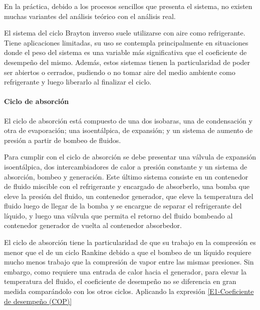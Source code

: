 	En la práctica, debido a los procesos sencillos que presenta el sistema, no existen muchas variantes del análisis teórico con el análisis real.

	El sistema del ciclo Brayton inverso suele utilizarse con aire como refrigerante. Tiene aplicaciones limitadas, su uso se contempla principalmente en situaciones donde el peso del sistema es una variable más significativa que el coeficiente de desempeño del mismo. Además, estos sistemas tienen la particularidad de poder ser abiertos o cerrados, pudiendo o no tomar aire del medio ambiente como refrigerante y luego liberarlo al finalizar el ciclo.


	\paragraph{Ciclo de absorción} El ciclo de absorción está compuesto de una dos isobaras, una de condensación y otra de evaporación; una isoentálpica, de expansión; y un sistema de aumento de presión a partir de bombeo de fluidos.

	Para cumplir con el ciclo de absorción se debe presentar una válvula de expansión isoentálpica, dos intercambiadores de calor a presión constante y un sistema de absorción, bombeo y generación. Este último sistema consiste en un contenedor de fluido miscible con el refrigerante y encargado de absorberlo, una bomba que eleve la presión del fluido, un contenedor generador, que eleve la temperatura del fluido luego de llegar de la bomba y se encargue de separar el refrigerante del líquido, y luego una válvula que permita el retorno del fluido bombeado al contenedor generador de vuelta al contenedor absorbedor.

	El ciclo de absorción tiene la particularidad de que su trabajo en la compresión es menor que el de un ciclo Rankine debido a que el bombeo de un líquido requiere mucho menos trabajo que la compresión de vapor entre las mismas presiones. Sin embargo, como requiere una entrada de calor hacia el generador, para elevar la temperatura del fluido, el coeficiente de desempeño no se diferencia en gran medida comparándolo con los otros ciclos. Aplicando la expresión \eqref{E1-Coeficiente de desempeño (COP)}

